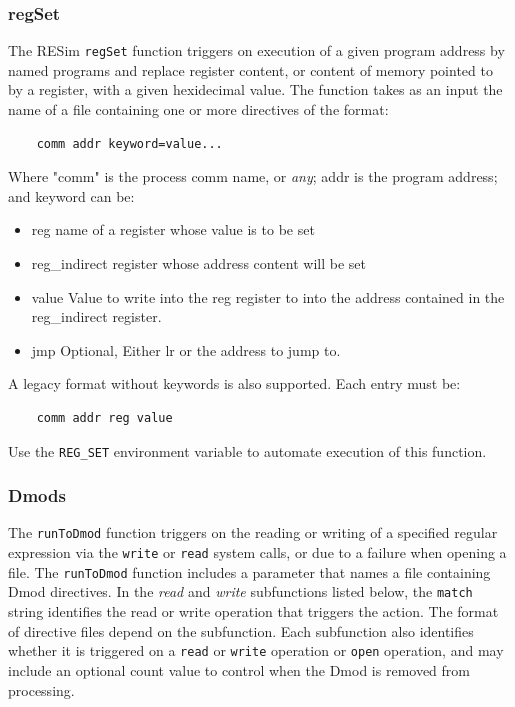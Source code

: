 \documentclass[titlepage]{article}
\begin{document}
\subsubsection{regSet}
\label{reg-set}
The RESim {\tt regSet} function triggers on execution of a given program address
by named programs and replace register content, or content of memory pointed to by a register,  with a given hexidecimal value.  The function takes as an
input the name of a file containing one or more directives of the format:
\begin{verbatim}
    comm addr keyword=value...
\end{verbatim}
Where "comm" is the process comm name, or \textit{any}; addr is the program address; and keyword can be:
\begin{itemize}
\item {reg} name of a register whose value is to be set
\item {reg\_indirect} register whose address content will be set
\item {value} Value to write into the reg register to into the address contained in the reg\_indirect register.
\item {jmp} Optional, Either lr or the address to jump to.
\end{itemize}

A legacy format without keywords is also supported.  Each entry must be:
\begin{verbatim}
    comm addr reg value
\end{verbatim}

Use the {\tt REG\_SET} environment variable to automate execution of this function.

\subsubsection{Dmods}
The {\tt runToDmod} function triggers on the reading or writing of a specified
regular expression via the {\tt write} or {\tt read} system calls, or due to a failure
when opening a file.    
The {\tt runToDmod} function includes a parameter that names a file containing
Dmod directives.  In the \textit{read} and \textit{write} subfunctions listed
below, the {\tt match} string identifies the read or write operation that triggers the action. 
The format of directive files depend on the subfunction.  Each subfunction also identifies whether it is
triggered on a {\tt read} or {\tt write} operation or {\tt open} operation, and may include an optional count value to control when
the Dmod is removed from processing.
\end{document}
